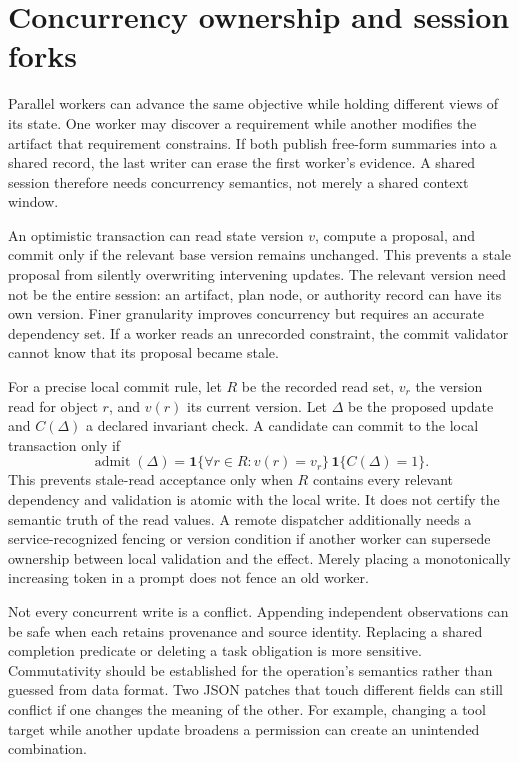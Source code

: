 \section{Concurrency ownership and session forks}\label{sec:C13:concurrency}
Parallel workers can advance the same objective while holding different views of its state. One worker may discover a requirement while another modifies the artifact that requirement constrains. If both publish free-form summaries into a shared record, the last writer can erase the first worker's evidence. A shared session therefore needs concurrency semantics, not merely a shared context window.

An optimistic transaction can read state version $v$, compute a proposal, and commit only if the relevant base version remains unchanged. This prevents a stale proposal from silently overwriting intervening updates. The relevant version need not be the entire session: an artifact, plan node, or authority record can have its own version. Finer granularity improves concurrency but requires an accurate dependency set. If a worker reads an unrecorded constraint, the commit validator cannot know that its proposal became stale.

For a precise local commit rule, let $R$ be the recorded read set, $v_r$ the version read for object $r$, and $v(r)$ its current version. Let $\Delta$ be the proposed update and $C(\Delta)$ a declared invariant check. A candidate can commit to the local transaction only if
\begin{equation}
 \operatorname{admit}(\Delta)=
 \mathbf1\{\forall r\in R:v(r)=v_r\}\,\mathbf1\{C(\Delta)=1\}.
\end{equation}
This prevents stale-read acceptance only when $R$ contains every relevant dependency and validation is atomic with the local write. It does not certify the semantic truth of the read values. A remote dispatcher additionally needs a service-recognized fencing or version condition if another worker can supersede ownership between local validation and the effect. Merely placing a monotonically increasing token in a prompt does not fence an old worker.

Not every concurrent write is a conflict. Appending independent observations can be safe when each retains provenance and source identity. Replacing a shared completion predicate or deleting a task obligation is more sensitive. Commutativity should be established for the operation's semantics rather than guessed from data format. Two JSON patches that touch different fields can still conflict if one changes the meaning of the other. For example, changing a tool target while another update broadens a permission can create an unintended combination.

